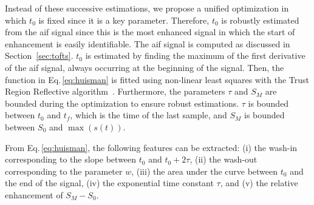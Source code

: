 Instead of these successive estimations, we propose a unified optimization in which $t_0$ is fixed since it is a key parameter.
Therefore, $t_0$ is robustly estimated from the \ac{aif} signal since this is the most enhanced signal in which the start of enhancement is easily identifiable.
The \ac{aif} signal is computed as discussed in Section~\ref{sec:tofts}.
$t_0$ is estimated by finding the maximum of the first derivative of the \ac{aif} signal, always occurring at the beginning of the signal.
Then, the function in Eq.\,\eqref{eq:huisman} is fitted using non-linear least squares with the Trust Region Reflective algorithm~\cite{sorensen1982newton}.
Furthermore, the parameters $\tau$ and $S_M$ are bounded during the optimization to ensure robust estimations.
$\tau$ is bounded between $t_0$ and $t_f$, which is the time of the
last sample, and $S_M$ is bounded between $S_0$ and $\max(s(t))$.


From Eq.\,\eqref{eq:huisman}, the following features can be extracted:
(i) the wash-in corresponding to the slope between $t_0$ and $t_0 + 2 \tau$,
(ii) the wash-out corresponding to the parameter $w$,
(iii) the area under the curve between $t_0$ and the end of the signal,
(iv) the exponential time constant $\tau$, and
(v) the relative enhancement of $S_M - S_0$.

